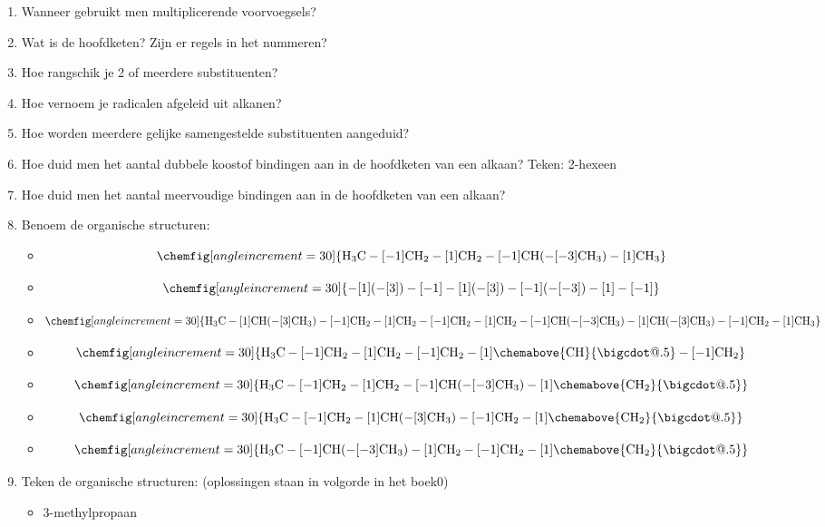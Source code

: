 \documentclass[a4paper,12pt]{article}
\makeatletter
\newcommand*\bigcdot{\mathpalette\bigcdot@{.5}}
\newcommand*\bigcdot@[2]{\mathbin{\vcenter{\hbox{\scalebox{#2}{$\m@th#1\bullet$}}}}}
\makeatother
\begin{document}
\begin{enumerate}
        \item Wanneer gebruikt men multiplicerende voorvoegsels?
        \item Wat is de hoofdketen? Zijn er regels in het nummeren?
        \item Hoe rangschik je 2 of meerdere substituenten?
        \item Hoe vernoem je radicalen afgeleid uit alkanen?
        \item Hoe worden meerdere gelijke samengestelde substituenten aangeduid? 
        \item Hoe duid men het aantal dubbele koostof bindingen aan in de hoofdketen van een alkaan? Teken: 2-hexeen
        \item Hoe duid men het aantal meervoudige bindingen aan in de hoofdketen van een alkaan? 
        \item Benoem de organische structuren:
            \begin{itemize}
                \item $$\chemfig[angle increment=30]{\ce{H3C}-[-1]\ce{CH2}-[1]\ce{CH2}-[-1]\ce{CH}(-[-3]\ce{CH3})-[1]\ce{CH3}}$$
                \item $$\chemfig[angle increment=30]{-[1](-[3])-[-1]-[1](-[3])-[-1](-[-3])-[1]-[-1]}$$
                \item $$\chemfig[angle increment=30]{\ce{H3C}-[1]\ce{CH}(-[3]\ce{CH3})-[-1]\ce{CH2}-[1]\ce{CH2}-[-1]\ce{CH2}-[1]\ce{CH2}-[-1]\ce{CH}(-[-3]\ce{CH3})-[1]\ce{CH}(-[3]\ce{CH3})-[-1]\ce{CH2}-[1]\ce{CH3}}$$
                \item $$\chemfig[angle increment=30]{\ce{H3C}-[-1]\ce{CH2}-[1]\ce{CH2}-[-1]\ce{CH2}-[1]\chemabove{\ce{CH}}{\bigcdot}-[-1]\ce{CH2}}$$
                \item $$\chemfig[angle increment=30]{\ce{H3C}-[-1]\ce{CH2}-[1]\ce{CH2}-[-1]\ce{CH}(-[-3]\ce{CH3})-[1]\chemabove{\ce{CH2}}{\bigcdot}}$$
                \item $$\chemfig[angle increment=30]{\ce{H3C}-[-1]\ce{CH2}-[1]\ce{CH}(-[3]\ce{CH3})-[-1]\ce{CH2}-[1]\chemabove{\ce{CH2}}{\bigcdot}}$$
                \item $$\chemfig[angle increment=30]{\ce{H3C}-[-1]\ce{CH}(-[-3]\ce{CH3})-[1]\ce{CH2}-[-1]\ce{CH2}-[1]\chemabove{\ce{CH2}}{\bigcdot}}$$
            \end{itemize}
        \item Teken de organische structuren: (oplossingen staan in volgorde in het boek0)
            \begin{itemize}
                \item 3-methylpropaan

\end{itemize}
\end{enumerate}
\end{document}
